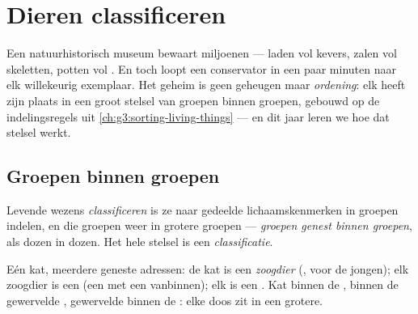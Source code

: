 \chapter{Dieren classificeren}\label{ch:g4:classifying-animals}

Een natuurhistorisch museum bewaart miljoenen  --- laden vol
kevers, zalen vol skeletten, potten vol . En toch loopt een
conservator in een paar minuten naar elk willekeurig exemplaar. Het
geheim is geen geheugen maar \emph{ordening}: elk  heeft zijn plaats
in een groot stelsel van groepen binnen groepen, gebouwd op de
indelingsregels uit \cref{ch:g3:sorting-living-things} --- en dit jaar
leren we hoe dat stelsel werkt.

\section{Groepen binnen groepen}

\begin{definition}[Classificatie]\label{def:g4:classifying-animals:classification}
Levende wezens \emph{classificeren} is ze naar
gedeelde lichaamskenmerken in groepen indelen, en die groepen weer in
grotere groepen --- \emph{groepen genest binnen
groepen}, als dozen in dozen. Het hele stelsel
is een \emph{classificatie}.
\end{definition}

\begin{example}\label{ex:g4:classifying-animals:cat}
Eén kat, meerdere geneste adressen: de kat is een \emph{zoogdier}
(,  voor de jongen); elk zoogdier is een \emph{}
(een  met een  vanbinnen); elk  is een
\emph{}. Kat binnen de ,  binnen de gewervelde
, gewervelde  binnen de : elke doos zit in een grotere.
\end{example}

